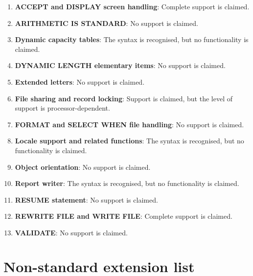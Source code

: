 \begin{enumerate}
\item \textbf{ACCEPT and DISPLAY screen handling}: Complete support is claimed.
\item \textbf{ARITHMETIC IS STANDARD}: No support is claimed.
\item \textbf{Dynamic capacity tables}: The syntax is recognised, but no functionality is claimed.
\item \textbf{DYNAMIC LENGTH elementary items}: No support is claimed.
\item \textbf{Extended letters}: No support is claimed.
\item \textbf{File sharing and record locking}: Support is claimed, but the level of support is processor-dependent. %
\item \textbf{FORMAT and SELECT WHEN file handling}: No support is claimed.
\item \textbf{Locale support and related functions}: The syntax is recognised, but no functionality is claimed.  %
\item \textbf{Object orientation}: No support is claimed.
\item \textbf{Report writer}: The syntax is recognised, but no functionality is claimed.
\item \textbf{RESUME statement}: No support is claimed.
\item \textbf{REWRITE FILE and WRITE FILE}: Complete support is claimed.
\item \textbf{VALIDATE}: No support is claimed.
\end{enumerate}

\section{Non-standard extension list}

